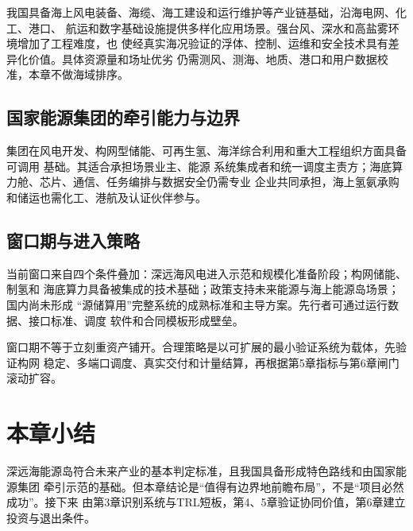 我国具备海上风电装备、海缆、海工建设和运行维护等产业链基础，沿海电网、化工、港口、
航运和数字基础设施提供多样化应用场景。强台风、深水和高盐雾环境增加了工程难度，也
使经真实海况验证的浮体、控制、运维和安全技术具有差异化价值。具体资源量和场址优劣
仍需测风、测海、地质、港口和用户数据校准，本章不做海域排序。

\subsection{国家能源集团的牵引能力与边界}

集团在风电开发、构网型储能、可再生氢、海洋综合利用和重大工程组织方面具备可调用
基础\cite{chnenergy-new-productivity,chnenergy-hydrogen}。其适合承担场景业主、能源
系统集成者和统一调度主责方；海底算力舱、芯片、通信、任务编排与数据安全仍需专业
企业共同承担，海上氢氨承购和储运也需化工、港航及认证伙伴参与。

\subsection{窗口期与进入策略}

当前窗口来自四个条件叠加：深远海风电进入示范和规模化准备阶段；构网储能、制氢和
海底算力具备被集成的技术基础；政策支持未来能源与海上能源岛场景；国内尚未形成
“源储算用”完整系统的成熟标准和主导方案。先行者可通过运行数据、接口标准、调度
软件和合同模板形成壁垒。

窗口期不等于立刻重资产铺开。合理策略是以可扩展的最小验证系统为载体，先验证构网
稳定、多端口调度、真实交付和计量结算，再根据第5章指标与第6章闸门滚动扩容。

\section*{本章小结}

深远海能源岛符合未来产业的基本判定标准，且我国具备形成特色路线和由国家能源集团
牵引示范的基础。但本章结论是“值得有边界地前瞻布局”，不是“项目必然成功”。接下来
由第3章识别系统与TRL短板，第4、5章验证协同价值，第6章建立投资与退出条件。


